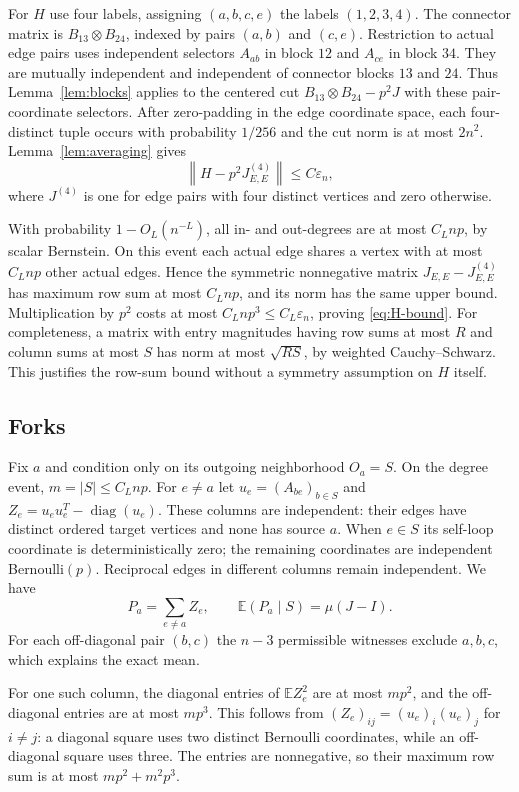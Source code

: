 \documentclass[11pt]{article}
\theoremstyle{remark}
\newcommand{\E}{\mathbb E}
\newcommand{\norm}[1]{\left\lVert#1\right\rVert}
\newcommand{\diag}{\operatorname{diag}}
\begin{document}
For $H$ use four labels, assigning $(a,b,c,e)$ the labels $(1,2,3,4)$.
The connector matrix is $B_{13}\otimes B_{24}$, indexed by pairs
$(a,b)$ and $(c,e)$. Restriction to actual edge pairs uses independent
selectors $A_{ab}$ in block $12$ and $A_{ce}$ in block $34$.
They are mutually independent and independent of connector blocks
$13$ and $24$. Thus Lemma~\ref{lem:blocks} applies to the centered cut
$B_{13}\otimes B_{24}-p^2J$ with these pair-coordinate selectors.
After zero-padding in the edge coordinate space, each four-distinct
tuple occurs with probability $1/256$ and the cut norm is at most $2n^2$.
Lemma~\ref{lem:averaging} gives
\[
 \norm{H-p^2J^{(4)}_{E,E}}\leq C\varepsilon_n,
\]
where $J^{(4)}$ is one for edge pairs with four distinct vertices and
zero otherwise.

With probability $1-O_L(n^{-L})$, all in- and out-degrees are at most
$C_Lnp$, by scalar Bernstein. On this event each actual edge shares
a vertex with at most $C_Lnp$ other actual edges. Hence the symmetric
nonnegative matrix $J_{E,E}-J^{(4)}_{E,E}$ has maximum row sum at most
$C_Lnp$, and its norm has the same upper bound. Multiplication by $p^2$
costs at most $C_Lnp^3\leq C_L\varepsilon_n$, proving
\eqref{eq:H-bound}. For completeness, a matrix with entry magnitudes
having row sums at most $R$ and column sums at most $S$ has norm at most
$\sqrt{RS}$, by weighted Cauchy--Schwarz. This justifies the row-sum
bound without a symmetry assumption on $H$ itself.

\subsection{Forks}

Fix $a$ and condition only on its outgoing neighborhood $O_a=S$.
On the degree event, $m=|S|\leq C_Lnp$. For $e\ne a$ let
$u_e=(A_{be})_{b\in S}$ and
$Z_e=u_eu_e^T-\diag(u_e)$. These columns are independent:
their edges have distinct ordered target vertices and none has source $a$.
When $e\in S$ its self-loop coordinate is deterministically zero; the
remaining coordinates are independent Bernoulli$(p)$.
Reciprocal edges in different columns remain independent. We have
\[
 P_a=\sum_{e\ne a}Z_e,\qquad \E(P_a\mid S)=\mu(J-I).
\]
For each off-diagonal pair $(b,c)$ the $n-3$ permissible witnesses exclude
$a,b,c$, which explains the exact mean.

For one such column, the diagonal entries of $\E Z_e^2$ are at most
$mp^2$, and the off-diagonal entries are at most $mp^3$.
This follows from $(Z_e)_{ij}=(u_e)_i(u_e)_j$ for $i\ne j$:
a diagonal square uses two distinct Bernoulli coordinates, while an
off-diagonal square uses three. The entries are nonnegative, so their
maximum row sum is at most $mp^2+m^2p^3$.
\end{document}
